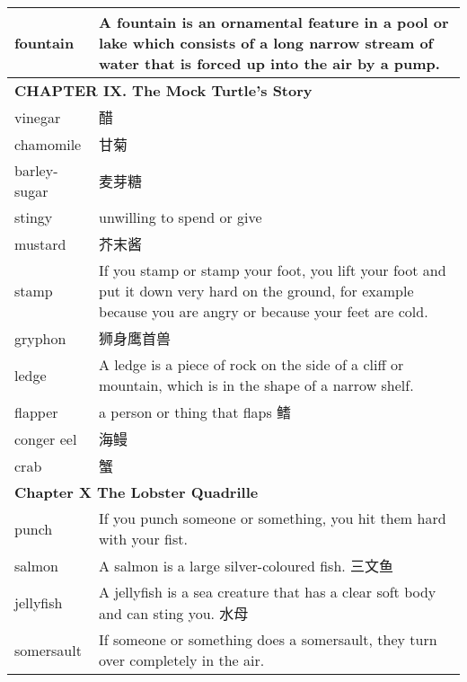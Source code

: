 \documentclass{ctexart}
\begin{document}
\begin{center}
\begin{longtable}{|l|p{7.8cm}|}
\hline
fountain
&
A fountain is an ornamental feature in a pool or lake which consists of a long narrow stream of water that is forced up into the air by a pump.
\\

\hline
\multicolumn{2}{|l|}{\textbf{ CHAPTER IX. The Mock Turtle’s Story}}\\

\hline
vinegar
&
醋
\\

\hline
chamomile
&
甘菊
\\

\hline
barley-sugar
&
麦芽糖
\\

\hline
stingy
&
unwilling to spend or give
\\

\hline
mustard
&
芥末酱
\\

\hline
stamp
&
If you stamp or stamp your foot, you lift your foot and put it down very hard on the ground, for example because you are angry or because your feet are cold.
\\

\hline
gryphon
&
狮身鹰首兽
\\

\hline
ledge
&
A ledge is a piece of rock on the side of a cliff or mountain, which is in the shape of a narrow shelf.
\\

\hline
flapper
&
a person or thing that flaps 鳍
\\

\hline
conger eel
&
海鳗
\\

\hline
crab
&
蟹
\\

\hline
\multicolumn{2}{|l|}{\textbf{Chapter X The Lobster Quadrille}}\\

\hline
punch
&
If you punch someone or something, you hit them hard with your fist.
\\

\hline
salmon
&
A salmon is a large silver-coloured fish. 三文鱼
\\

\hline
jellyfish
&
A jellyfish is a sea creature that has a clear soft body and can sting you. 水母
\\

\hline
somersault
&
If someone or something does a somersault, they turn over completely in the air.
\\


\end{longtable}
\end{center}
\end{document}
